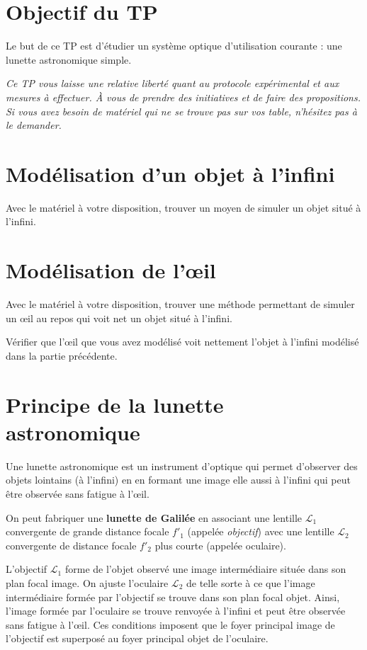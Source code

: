 \documentclass{tp}
\begin{document}

\section{Objectif du TP}
Le but de ce TP est d'étudier un système optique d'utilisation courante : une lunette astronomique simple.

\textit{Ce TP vous laisse une relative liberté quant au protocole expérimental et aux mesures à effectuer. \`A vous de prendre des initiatives et de faire des propositions. Si vous avez besoin de matériel qui ne se trouve pas sur vos table, n'hésitez pas à le demander.}

\section{Modélisation d'un objet à l'infini} 
Avec le matériel à votre disposition, trouver un moyen de simuler un objet situé à l'infini.

\section{Modélisation de l'\oe il}
Avec le matériel à votre disposition, trouver une méthode permettant de simuler un \oe il au repos qui voit net un objet situé à l'infini.

Vérifier que l'\oe il que vous avez modélisé voit nettement l'objet à l'infini modélisé dans la partie précédente.

\section{Principe de la lunette astronomique}
Une lunette astronomique est un instrument d'optique qui permet d'observer des objets lointains (à l'infini) en en formant une image elle aussi à l'infini qui peut être observée sans fatigue à l'\oe il. 

On peut fabriquer une \textbf{lunette de Galilée} en associant une lentille $\mathcal{L}_1$ convergente de grande distance focale $f'_1$ (appelée \textit{objectif}) avec une lentille $\mathcal{L}_2$ convergente de distance focale $f'_2$ plus courte (appelée oculaire).

L'objectif $\mathcal{L}_1$ forme de l'objet observé une image intermédiaire située dans son plan focal image. On ajuste l'oculaire $\mathcal{L}_2$ de telle sorte à ce que l'image intermédiaire formée par l'objectif se trouve dans son plan focal objet. Ainsi, l'image formée par l'oculaire se trouve renvoyée à l'infini et peut être observée sans fatigue à l'\oe il. Ces conditions imposent que le foyer principal image de l'objectif est superposé au foyer principal objet de l'oculaire.
\end{document}
